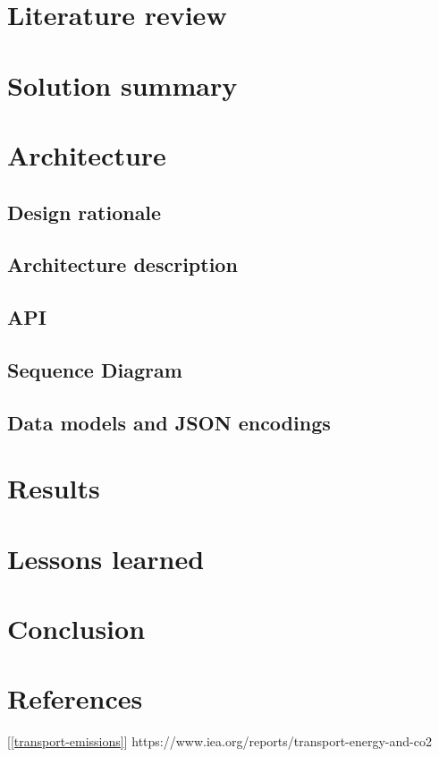\documentclass[11pt, oneside]{article}
\begin{document}
\section{Literature review}

\section{Solution summary}

\section{Architecture}

\subsection{Design rationale}

\subsection{Architecture description}

\subsection{API}

\subsection{Sequence Diagram}

\subsection{Data models and JSON encodings}

\section{Results}

\section{Lessons learned}

\section{Conclusion}
 
 
\section{References}

\begin{small}

[\ref{transport-emissions}] https://www.iea.org/reports/transport-energy-and-co2


\end{small}
\end{document}
